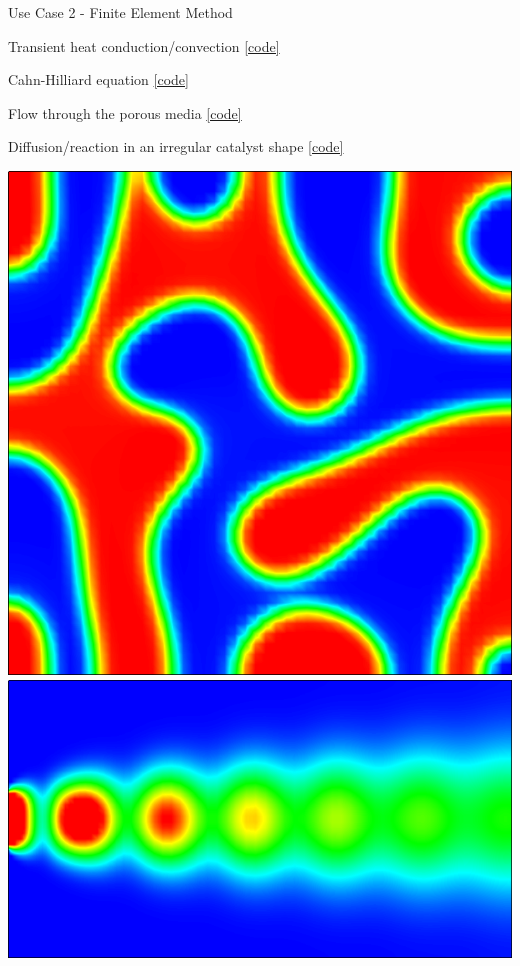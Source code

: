 \documentclass[compress,newPxFont,sthlmFooter]{beamer}
\begin{document}
\begin{frame}[plain]{Use Case 2 - Finite Element Method}
    \begin{itemize}
      {\small
          \item \alert{Transient heat conduction/convection}
                \href{http://daetools.com/docs/tutorials-fe.html\#tutorial-dealii-2}{[code]}
          \item \alert{Cahn-Hilliard equation}
                \href{http://daetools.com/docs/tutorials-fe.html\#tutorial-dealii-3}{[code]}
          \item \alert{Flow through the porous media}
                \href{http://daetools.com/docs/tutorials-fe.html\#tutorial-dealii-5}{[code]}
          \item \alert{Diffusion/reaction in an irregular catalyst shape}
                \href{http://daetools.com/docs/tutorials-fe.html\#tutorial-dealii-6}{[code]}
      }
    \end{itemize}
    \begin{center}
        \includegraphics[align=c, height=0.35\textheight]{cahn-hilliard.png}
        \;
        \includegraphics[align=c, height=0.35\textheight]{heat_convection.png}
    \end{center}
\end{frame}
\end{document}
